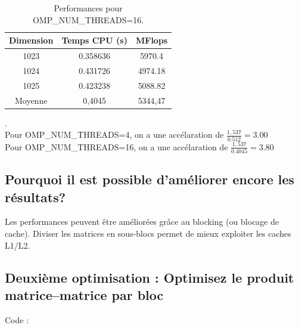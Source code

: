 \documentclass[a4paper,13pt]{book}
\begin{document}
\begin{table}[h!]
    \begin{center}
    \begin{tabular}{|c|c|c|}
        \hline
        Dimension & Temps CPU (s) & MFlops \\ \hline
        1023      & 0.358636       & 5970.4 \\ \hline
        1024      & 0.431726       & 4974.18 \\ \hline
        1025      & 0.423238        & 5088.82 \\ \hline
        Moyenne      & 0,4045        & 5344,47 \\ \hline
    \end{tabular}
    \caption{Performances pour OMP\_NUM\_THREADS=16.}
\end{center}
\end{table}.\\
Pour OMP\_NUM\_THREADS=4, on a une accélaration de $\frac{1,537}{0.512}=3.00$\\
Pour OMP\_NUM\_THREADS=16, on a une accélaration de $\frac{1,537}{0.4045}=3.80$
\clearpage
\subsection{Pourquoi il est possible d'améliorer encore les résultats?}

    Les performances peuvent être améliorées grâce au blocking  (ou blocage de cache).
    Diviser les matrices en sous-blocs permet de mieux exploiter les caches L1/L2.

\subsection{Deuxième optimisation : Optimisez le produit matrice–matrice par bloc}

Code : \\
\end{document}

